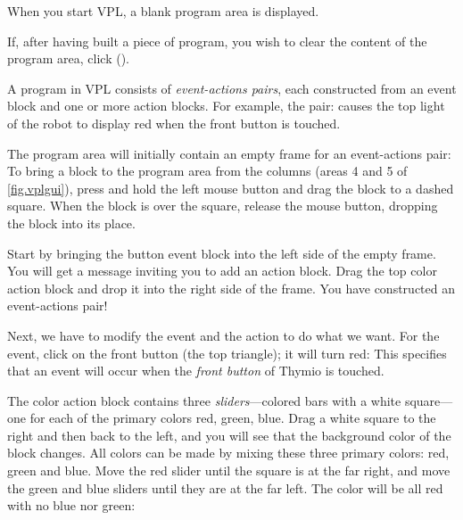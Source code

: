 

When you start VPL, a blank program area is displayed.

If, after having built a piece of program, you wish to clear the content
of the program area, click  ().

A program in VPL consists of \emph{event-actions pairs}, each
constructed from an event block and one or more action blocks. For
example, the pair:  causes the top light of the robot to
display red when the front button is touched.


The program area will initially contain an empty frame for an
event-actions pair:  To bring a block to the program
area from the columns (areas 4 and 5 of \cref{fig.vplgui}), press and
hold the left mouse button and drag the block to a dashed square. When the
block is over the square, release the mouse button, dropping the block
into its place.


Start by bringing the button event block  into the
left side of the empty frame. You will get a message inviting you to add
an action block. Drag the top color action block
 and drop it into the right side of the frame. You have
constructed an event-actions pair!

Next, we have to modify the event and the action to do what we want. For
the event, click on the front button (the top triangle); it will turn
red:  This specifies that an event will occur when the
\textit{front button} of Thymio is touched.

The color action block contains three \emph{sliders}---colored bars with
a white square---one for each of the primary colors red, green, blue.
Drag a white square to the right and then back to the left, and you will
see that the background color of the block changes. All colors can be
made by mixing these three primary colors: red, green and blue. Move
the red slider until the square is at the far right, and move the green
and blue sliders until they are at the far left. The color will be all
red with no blue nor green: 

